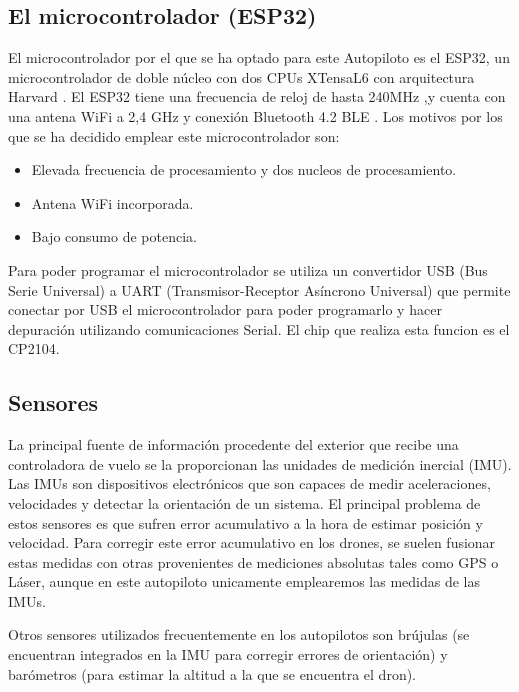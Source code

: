 \subsection{El microcontrolador (ESP32)}

El microcontrolador por el que se ha optado para este Autopiloto es el ESP32, un microcontrolador de doble núcleo con dos CPUs XTensaL6 con arquitectura Harvard \cite{ESP32TechnicalReference}. El ESP32 tiene una frecuencia de reloj de hasta 240MHz ,y cuenta con una antena WiFi a 2,4 GHz y conexión Bluetooth 4.2 BLE \cite{ESP32DataSheet}. Los motivos por los que se ha decidido emplear este microcontrolador son:
\begin{itemize}
	\item Elevada frecuencia de procesamiento y dos nucleos de procesamiento.
	\item Antena WiFi incorporada.
	\item Bajo consumo de potencia.
\end{itemize}

\par Para poder programar el microcontrolador se utiliza un convertidor USB (Bus Serie Universal) a UART (Transmisor-Receptor Asíncrono Universal) que permite conectar por USB el microcontrolador para poder programarlo y hacer depuración utilizando comunicaciones Serial. El chip que realiza esta funcion es el CP2104.

\subsection{Sensores}
La principal fuente de información procedente del exterior que recibe una controladora de vuelo se la proporcionan las unidades de medición inercial (IMU). Las IMUs son dispositivos electrónicos que son capaces de medir aceleraciones, velocidades y detectar la orientación de un sistema. El principal problema de estos sensores es que sufren error acumulativo a la hora de estimar posición y velocidad. Para corregir este error acumulativo en los drones, se suelen fusionar estas medidas con otras provenientes de mediciones absolutas tales como GPS o Láser, aunque en este autopiloto unicamente emplearemos las medidas de las IMUs.

\par Otros sensores utilizados frecuentemente en los autopilotos son brújulas (se encuentran integrados en la IMU para corregir errores de orientación) y barómetros (para estimar la altitud a la que se encuentra el dron).\\
\medskip

